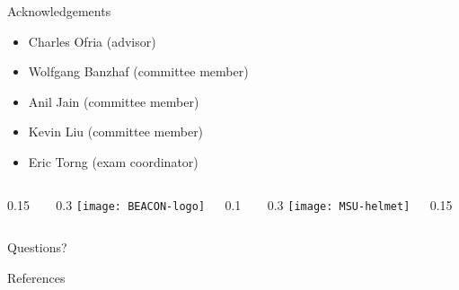 \appendix

\begin{frame}{Acknowledgements}
\begin{itemize}
\item Charles Ofria (advisor)
\item Wolfgang Banzhaf (committee member)
\item Anil Jain (committee member)
\item Kevin Liu (committee member)
\item Eric Torng (exam coordinator)
\end{itemize}
\vspace{-1ex}

\newcommand{\innerspacer}{0.1\textwidth}
\newcommand{\content}{0.3\textwidth}
\newcommand{\outerspacer}{0.15\textwidth}


\begin{center}
 \begin{columns}
	\begin{column}{\outerspacer}~\end{column}
	 \begin{column}{\content}
		\texttt{[image: BEACON-logo]}
 	\end{column}
  \begin{column}{\innerspacer}~\end{column}
 	\begin{column}{\content}
   \texttt{[image: MSU-helmet]}
 	\end{column}
 	\begin{column}{\outerspacer}~\end{column}
 \end{columns}
\end{center}

\end{frame}


\begin{frame}[standout]
  Questions?
\end{frame}

\begin{frame}[allowframebreaks]{References}

  
  
\end{frame}
